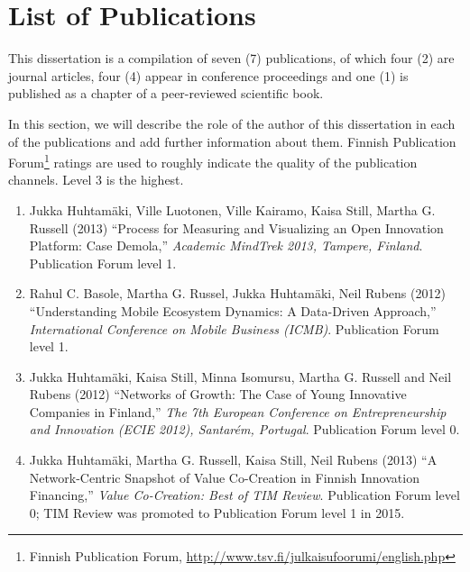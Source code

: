 \chapter{List of Publications}

\begin{midsloppypar}

This dissertation is a compilation of seven (7) publications, of which four (2) are journal articles, four (4) appear in conference proceedings and one (1) is published as a chapter of a peer-reviewed scientific book.

In this section, we will describe the role of the author of this dissertation in each of the publications and add further information about them. Finnish Publication Forum\footnote{Finnish Publication Forum, \url{http://www.tsv.fi/julkaisufoorumi/english.php}} ratings are used to roughly indicate the quality of the publication channels. Level 3 is the highest.

\begin{enumerate}[label=\textbf{Publication \Roman*},align=left]

  \item Jukka Huhtamäki, Ville Luotonen, Ville Kairamo, Kaisa Still, Martha G. Russell 
  (2013)
  ``Process for Measuring and Visualizing an Open Innovation Platform: Case Demola,''
  \emph{Academic MindTrek 2013, Tampere, Finland}.
  Publication Forum level 1.
  \label{pub:demola}

  \item Rahul C. Basole, Martha G. Russel, Jukka Huhtamäki, Neil Rubens
  (2012)
  ``Understanding Mobile Ecosystem Dynamics: A Data-Driven Approach,''
  \emph{International Conference on Mobile Business (ICMB)}.
  Publication Forum level 1.
  \label{pub:mobileecosystem}

  \item Jukka Huhtamäki, Kaisa Still, Minna Isomursu, Martha G. Russell and Neil Rubens
  (2012)
  ``Networks of Growth: The Case of Young Innovative Companies in Finland,'' 
  \emph{The 7th European Conference on Entrepreneurship and Innovation (ECIE 2012), Santarém, Portugal}.
  Publication Forum level 0.
  \label{pub:tekesyic}

  \item Jukka Huhtamäki, Martha G. Russell, Kaisa Still, Neil Rubens
  (2013)
  ``A Network-Centric Snapshot of Value Co-Creation in Finnish Innovation Financing,'' 
  \emph{Value Co-Creation: Best of TIM Review}.
  Publication Forum level 0; TIM Review was promoted to Publication Forum level 1 in 2015.
  \label{pub:finland}


\end{enumerate}
\end{midsloppypar}
